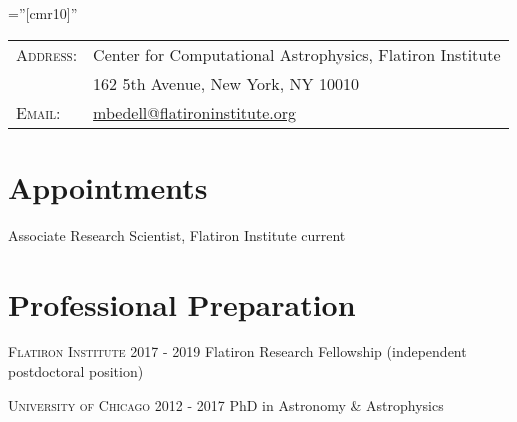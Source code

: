 \documentclass[letter,12pt]{article} %
\begin{document}

\pagestyle{empty} %

\font\fb=''[cmr10]'' %


\par{\bigskip\par} %




\begin{tabular}{ll}
\textsc{Address:} & Center for Computational Astrophysics, Flatiron Institute \\
  & 162 5th Avenue, New York, NY 10010 \\
\textsc{Email:} & \href{mailto:mbedell@flatironinstitute.org}{mbedell@flatironinstitute.org}\\
\end{tabular}

\section{Appointments}
Associate Research Scientist, Flatiron Institute \hfill current

\section{Professional Preparation}
\textsc{Flatiron Institute} \hfill 2017 - 2019
\newline Flatiron Research Fellowship (independent postdoctoral position)

\textsc{University of Chicago}  \hfill 2012 - 2017
\newline PhD in Astronomy \& Astrophysics
\end{document}
